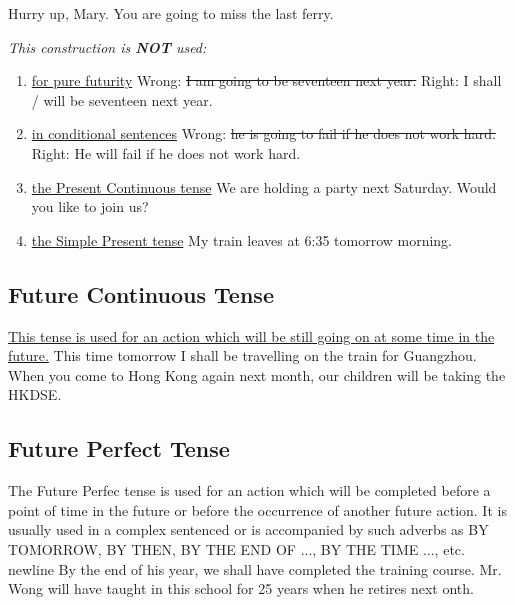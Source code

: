 \begin{enumerate}
\begin{enumerate}
\begin{enumerate}
                        Hurry up, Mary. You are going to miss the last ferry.
                \end{enumerate}
                {\it This construction is {\bf NOT} used:}
                \begin{enumerate}
                    \item \underline{for pure futurity}
                        \newline
                        Wrong: \st{I am going to be seventeen next year.}
                        \newline
                        Right: I shall / will be seventeen next year.
                    \item \underline{in conditional sentences}
                        \newline
                        Wrong: \st{he is going to fail if he does not work
                        hard.}
                        \newline
                        Right: He will fail if he does not work hard.
                    \item \underline{the Present Continuous tense}
                        \newline
                        We are holding a party next Saturday. Would you like to
                        join us?
                    \item \underline{the Simple Present tense}
                        \newline
                        My train leaves at 6:35 tomorrow morning.
                \end{enumerate}
        \end{enumerate}
\end{enumerate}

\subsection{Future Continuous Tense}
\underline{This tense is used for an action which will be still going on at some
time in the future.}
\newline
\newline
This time tomorrow I shall be travelling on the train for Guangzhou.
\newline
When you come to Hong Kong again next month, our children will be taking the
HKDSE.

\subsection{Future Perfect Tense}
The Future Perfec tense is used for an action which will be completed before a
point of time in the future or before the occurrence of another future action.
It is usually used in a complex sentenced or is accompanied by such adverbs as
BY TOMORROW, BY THEN, BY THE END OF ..., BY THE TIME ..., etc.
\newline
newline
By the end of his year, we shall have completed the training course.
\newline
Mr. Wong will have taught in this school for 25 years when he retires next onth.

